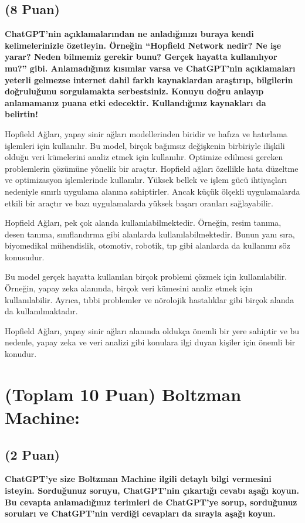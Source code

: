 \documentclass[11pt]{article}
\begin{document}
\subsection{(8 Puan)} \textbf{ChatGPT’nin açıklamalarından ne anladığınızı buraya kendi kelimelerinizle özetleyin. Örneğin ``Hopfield Network nedir? Ne işe yarar? Neden bilmemiz gerekir bunu? Gerçek hayatta kullanılıyor mu?'' gibi. Anlamadığınız kısımlar varsa ve ChatGPT’nin açıklamaları yeterli gelmezse internet dahil farklı kaynaklardan araştırıp, bilgilerin doğruluğunu sorgulamakta serbestsiniz. Konuyu doğru anlayıp anlamamanız puana etki edecektir. Kullandığınız kaynakları da belirtin!}

Hopfield Ağları, yapay sinir ağları modellerinden biridir ve hafıza ve hatırlama işlemleri için kullanılır. Bu model, birçok bağımsız değişkenin birbiriyle ilişkili olduğu veri kümelerini analiz etmek için kullanılır. Optimize edilmesi gereken problemlerin çözümüne yönelik bir araçtır. Hopfield ağları özellikle hata düzeltme ve optimizasyon işlemlerinde kullanılır. Yüksek bellek ve işlem gücü ihtiyaçları nedeniyle sınırlı uygulama alanına sahiptirler. Ancak küçük ölçekli uygulamalarda etkili bir araçtır ve bazı uygulamalarda yüksek başarı oranları sağlayabilir.

Hopfield  Ağları, pek çok alanda kullanılabilmektedir. Örneğin, resim tanıma, desen tanıma, sınıflandırma gibi alanlarda kullanılabilmektedir. Bunun yanı sıra, biyomedikal mühendislik, otomotiv, robotik, tıp gibi alanlarda da kullanımı söz konusudur.

Bu model gerçek hayatta kullanılan birçok problemi çözmek için kullanılabilir. Örneğin, yapay zeka alanında, birçok veri kümesini analiz etmek için kullanılabilir. Ayrıca, tıbbi problemler ve nörolojik hastalıklar gibi birçok alanda da kullanılmaktadır.

Hopfield Ağları, yapay sinir ağları alanında oldukça önemli bir yere sahiptir ve bu nedenle, yapay zeka ve veri analizi gibi konulara ilgi duyan kişiler için önemli bir konudur.

\section{(Toplam 10 Puan) Boltzman Machine:}

\subsection{(2 Puan)} \textbf{ChatGPT’ye size Boltzman Machine ilgili detaylı bilgi vermesini isteyin. Sorduğunuz soruyu, ChatGPT'nin çıkartığı cevabı aşağı koyun. Bu cevapta anlamadığınız terimleri de ChatGPT’ye sorup, sorduğunuz soruları ve ChatGPT’nin verdiği cevapları da sırayla aşağı koyun.}
\end{document}
